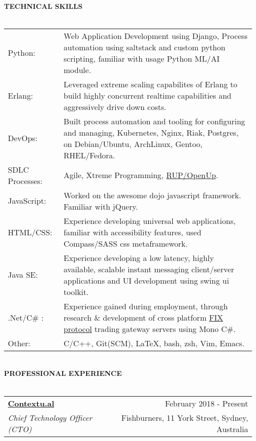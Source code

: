 \documentclass[10pt]{article}
\makeatletter
\newcommand{\lineunder}{\vspace*{-10pt} \\ \hspace*{-18pt} \hrulefill \vspace{2pt}\\}
\newcommand{\header}[1]{{\hspace*{-15pt}\vspace*{-0pt}\\ \uppercase{\textbf {#1}}}  \lineunder}
\newcommand{\employer}[4]{ 
        \vspace*{6pt}
	\begin{tabular*}{\textwidth}{l@{\extracolsep{\fill}}r}
	\textbf{#1} & #2 \\
                #3  & #4 \\ 
	\end{tabular*}
}
\makeatother
\begin{document}
\header{Technical Skills}
\vspace{2pt}
\begin{tabular*}{\textwidth}{p{3cm}p{}}
    Python: & Web Application Development using Django, Process automation using saltstack and custom python scripting, familiar with usage Python ML/AI module. \\
    Erlang: & Leveraged extreme scaling capabilites of Erlang to build highly concurrent realtime capabilities and aggressively drive down costs. \\
    DevOps: & Built process automation and tooling for configuring and managing, Kubernetes, Nginx, Riak, Postgres, on Debian/Ubuntu, ArchLinux, Gentoo, RHEL/Fedora. \\
    SDLC Processes: & Agile, Xtreme Programming, \href{http://en.wikipedia.org/wiki/Unified\_process}{RUP/OpenUp}. \\
    JavaScript: & Worked on the awesome dojo javascript framework. Familiar with jQuery. \\
    HTML/CSS: & Experience developing universal web applications, familiar with accessibility features, used Compass/SASS css metaframework. \\
    Java SE: & Experience developing a low latency, highly available, scalable instant messaging client/server applications and UI development using swing ui toolkit. \\
    .Net/C\# : & Experience gained during employment, through research \& development of cross platform \href{http://en.wikipedia.org/wiki/FIX_protocol}{FIX protocol} trading gateway servers using Mono C\#. \\
    Other: & C/C++, Git(SCM), \LaTeX, bash, zsh, Vim, Emacs.\\
\end{tabular*}
\vspace{15pt}
\header{Professional Experience}
\employer{\href{http://www.contextu.al/}{Contextu.al}}{February 2018 - Present}{\emph{Chief Technology Officer (CTO)}} {Fishburners, 11 York Street, Sydney, Australia}
\end{document}
